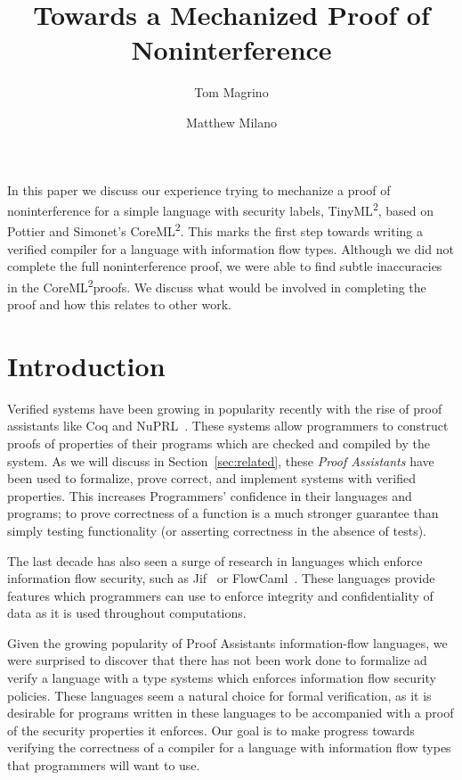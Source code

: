 \documentclass[a4paper,twocolumn]{article}
\title{Towards a Mechanized Proof of Noninterference}
\author{Tom Magrino \and Matthew Milano}
\newcommand{\langName}[0]{TinyML\textsuperscript{2}}
\newcommand{\origLang}[0]{CoreML\textsuperscript{2}}
\theoremstyle{plain}
\theoremstyle{definition}
\begin{document}
\maketitle

\abstract

In this paper we discuss our experience trying to mechanize a proof of
noninterference for a simple language with security labels, \langName, based on
Pottier and Simonet's \origLang.  This
marks the first step towards writing a verified compiler for a language with
information flow types.  Although we did not complete the full noninterference
proof, we were able to find subtle inaccuracies in the \origLang proofs.  
We discuss what would be involved in completing the proof and how this 
relates to other work.

\section{Introduction}

Verified systems have been growing in popularity recently with the rise of proof
assistants like Coq and NuPRL~\cite{coqart,nuprl}.  
These systems allow programmers to construct proofs of properties of their programs which are checked and compiled by the system.  As we will
discuss in Section~\ref{sec:related}, these \emph{Proof Assistants} have been used to formalize,
prove correct, and implement systems with verified properties.  This increases Programmers' confidence in their languages and programs; to prove correctness of a function is a much stronger guarantee than simply testing functionality (or asserting correctness in the absence of tests).

The last decade has also seen a surge of research in languages which enforce information flow security, such as Jif~\cite{myers1999jflow} or FlowCaml~\cite{simonet2003flow}.  These languages provide features which programmers can use to enforce integrity and confidentiality of data as it is used throughout computations.

Given the growing popularity of Proof Assistants information-flow languages, we were surprised to discover 
that there has not been work done to formalize ad verify a language with a type systems which enforces information flow security policies.
These languages seem a natural choice for formal verification, as it is desirable for programs written in these languages to be accompanied with a proof of the security properties it enforces.
Our goal is to make progress towards verifying the correctness of a
compiler for a language with information flow types that programmers will want
to use.
\end{document}
